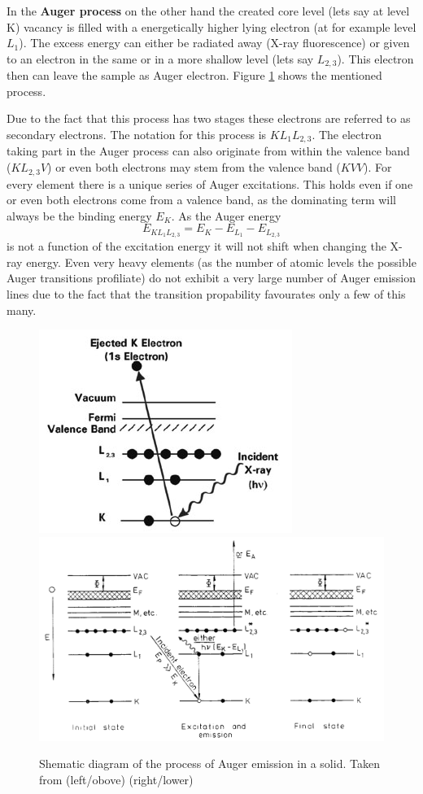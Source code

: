  In the \textbf{Auger process}  on the other hand the created core level (lets say at level K) vacancy is filled with a energetically higher lying electron (at for example level $L_1$). The excess energy can either be radiated away (X-ray fluorescence) or given to an electron in the same or in a more shallow level (lets say $L_{2,3}$). This electron then can leave the sample as Auger electron. Figure \ref{fig:auger-core} shows the mentioned process. 
 
 Due to the fact that this process has two stages these electrons are referred to as secondary electrons. The notation for this process is $KL_1L_{2,3}$. The electron taking part in the Auger process can also originate from within the valence band ($KL_{2,3}V$) or even both electrons may stem from the valence band ($KVV$). For every element there is a unique series of Auger excitations. This holds even if one or even both electrons come from a valence band, as the dominating term will always be the binding energy $E_K$. As the Auger energy $$E_{KL_1L_{2,3}}=E_K-E_{L_1}-E_{L_{2,3}}$$ is not a function of the excitation energy it will not shift when changing the X-ray energy. Even very heavy elements (as the number of atomic levels the possible Auger transitions profiliate) do not exhibit a very large number of Auger emission lines due to the fact that the transition propability favourates only a few of this many. \cite{Briggs_90}

\begin{figure}\centering
\includegraphics[height=0.3\textwidth]{./images/whatisxps-04.jpg}
\includegraphics[height=0.45\textwidth]{./images/auger.jpg}
\caption{Shematic diagram of the process of Auger emission in a solid. Taken from \cite{_whatisxps-04.jpg_2015}(left/obove) \cite{Briggs_90}(right/lower)}
\label{fig:auger-core}
\end{figure}

